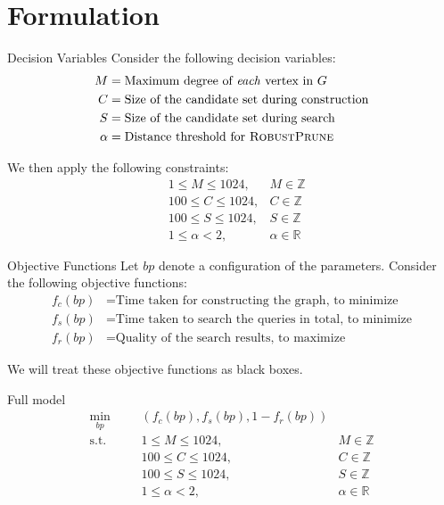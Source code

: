\section{Formulation}

\frame{\insertsection}

\begin{frame}{Decision Variables}
    Consider the following decision variables:
    \[
    \begin{aligned}
        M &= \text{Maximum degree of \textit{each} vertex in \(G\)} \\
        C &= \text{Size of the candidate set during construction} \\
        S &= \text{Size of the candidate set during search} \\
        \alpha &= \text{Distance threshold for \textsc{RobustPrune}}
    \end{aligned}
    \]
    
    We then apply the following constraints:
    \[
    \begin{aligned}
        &1 \leq M \leq 1024, & M \in \mathbb{Z} \\
        &100 \leq C \leq 1024, & C \in \mathbb{Z} \\
        &100 \leq S \leq 1024, & S \in \mathbb{Z} \\
        &1 \leq \alpha < 2, &\alpha \in \mathbb{R}
    \end{aligned}
    \]
\end{frame}

\begin{frame}{Objective Functions}
    Let \(bp\) denote a configuration of the parameters. Consider the following objective functions:
    \[
    \begin{aligned}
        f_c(bp) &= \text{Time taken for constructing the graph, to minimize} \\
        f_s(bp) &= \text{Time taken to search the queries in total, to minimize} \\
        f_r(bp) &= \text{Quality of the search results, to maximize}
    \end{aligned}
    \]

    We will treat these objective functions as black boxes.
\end{frame}

\begin{frame}{Full model}
    \[
    \begin{aligned}
        \min_{bp} &\left(f_c(bp), f_s(bp), 1 - f_r(bp)\right) \\
        \text{s.t.} \qquad
            &1 \leq M \leq 1024, & M \in \mathbb{Z} \\
            &100 \leq C \leq 1024, & C \in \mathbb{Z} \\
            &100 \leq S \leq 1024, & S \in \mathbb{Z} \\
            &1 \leq \alpha < 2, &\alpha \in \mathbb{R}
    \end{aligned}
    \]
\end{frame}
